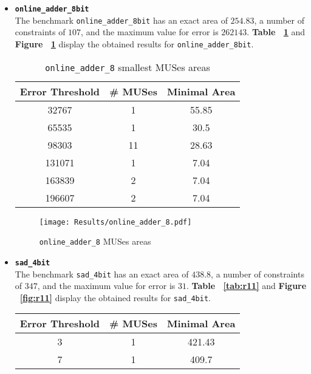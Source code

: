 \documentclass[]{usiinfbachelorproject}
\begin{document}
\begin{itemize}
    \item \texttt{\textbf{online\_adder\_8bit}}\\
        The benchmark \texttt{online\_adder\_8bit} has an exact area of $254.83$, a number of constraints of $107$, and the maximum value for error is $262143$. \textbf{Table ~\ref{tab:r10}} and \textbf{Figure ~\ref{fig:r10}} display the obtained results for \texttt{online\_adder\_8bit}.
        \begin{table}[H]
            \centering
            \begin{tabular}{c|c|c}
                \textbf{Error Threshold} & \textbf{\# MUSes} & \textbf{Minimal Area} \\ \hline
                32767 & 1 & 55.85 \\
                \hline
                65535 & 1 & 30.5 \\
                \hline
                98303 & 11 & 28.63 \\
                \hline
                131071 & 1 & 7.04 \\
                \hline
                163839 & 2 & 7.04 \\
                \hline
                196607 & 2 & 7.04    
            \end{tabular}
            \caption{\texttt{online\_adder\_8} smallest MUSes areas}
            \label{tab:r10}
        \end{table}
        \begin{figure}[H]
            \centering
            \texttt{[image: Results/online\_adder\_8.pdf]}
            \caption{\texttt{online\_adder\_8} MUSes areas}
            \label{fig:r10}
        \end{figure}
    \item \texttt{\textbf{sad\_4bit}}\\
        The benchmark \texttt{sad\_4bit} has an exact area of $438.8$, a number of constraints of $347$, and the maximum value for error is $31$. \textbf{Table ~\ref{tab:r11}} and \textbf{Figure ~\ref{fig:r11}} display the obtained results for \texttt{sad\_4bit}.
        \begin{table}[H]
            \centering
            \begin{tabular}{c|c|c}
                \textbf{Error Threshold} & \textbf{\# MUSes} & \textbf{Minimal Area} \\ \hline
                3 & 1 & 421.43 \\
                \hline
                7 & 1 & 409.7 \\

\end{tabular}
\end{table}
\end{itemize}
\end{document}
